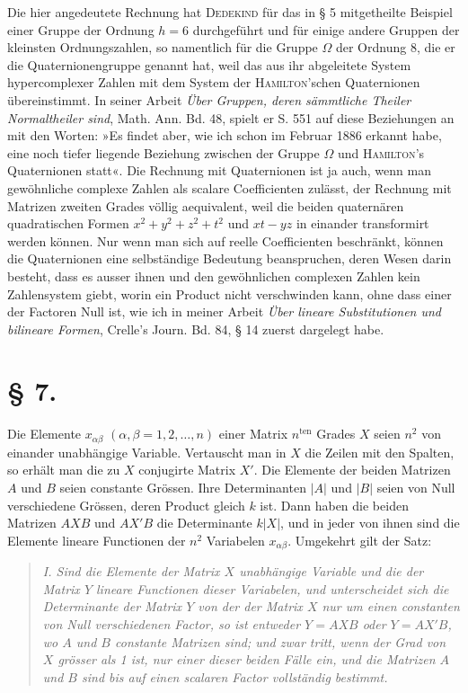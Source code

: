 \documentclass[11pt]{article}
\newcommand{\ten}{\mathrm{ten}}
\begin{document}
Die hier angedeutete Rechnung hat \textsc{Dedekind} für das in § 5 mitgetheilte Beispiel einer Gruppe der Ordnung $h=6$ durchgeführt und für einige andere Gruppen der kleinsten Ordnungszahlen, so namentlich für die Gruppe $\Omega$ der Ordnung 8, die er die Quaternionengruppe genannt hat, weil das aus ihr abgeleitete System hypercomplexer Zahlen mit dem System der \textsc{Hamilton}'schen Quaternionen übereinstimmt. In seiner Arbeit \emph{Über Gruppen, deren sämmtliche Theiler Normaltheiler sind}, Math. Ann. Bd. 48, spielt er S. 551 auf diese Beziehungen an mit den Worten: »Es findet aber, wie ich schon im Februar 1886 erkannt habe, eine noch tiefer liegende Beziehung zwischen der Gruppe $\Omega$ und \textsc{Hamilton}'s Quaternionen statt«. Die Rechnung mit Quaternionen ist ja auch, wenn man gewöhnliche complexe Zahlen als scalare Coefficienten zulässt, der Rechnung mit Matrizen zweiten Grades völlig aequivalent, weil die beiden quaternären quadratischen Formen $x^2+y^2+z^2+t^2$ und $xt-yz$ in einander transformirt werden können. Nur wenn man sich auf reelle Coefficienten beschränkt, können die Quaternionen eine selbständige Bedeutung beanspruchen, deren Wesen darin besteht, dass es ausser ihnen und den gewöhnlichen complexen Zahlen kein Zahlensystem giebt, worin ein Product nicht verschwinden kann, ohne dass einer der Factoren Null ist, wie ich in meiner Arbeit \emph{Über lineare Substitutionen und bilineare Formen}, Crelle's Journ. Bd. 84, § 14 zuerst dargelegt habe.

\section*{§ 7.}

Die Elemente $x_{\alpha\beta}$ $(\alpha,\beta=1,2,\ldots,n)$ einer Matrix $n^{\ten}$ Grades $X$ seien $n^2$ von einander unabhängige Variable. Vertauscht man in $X$ die Zeilen mit den Spalten, so erhält man die zu $X$ conjugirte Matrix $X'$. Die Elemente der beiden Matrizen $A$ und $B$ seien constante Grössen. Ihre Determinanten $|A|$ und $|B|$ seien von Null verschiedene Grössen, deren Product gleich $k$ ist. Dann haben die beiden Matrizen $AXB$ und $AX'B$ die Determinante $k|X|$, und in jeder von ihnen sind die Elemente lineare Functionen der $n^2$ Variabelen $x_{\alpha\beta}$. Umgekehrt gilt der Satz:

\begin{quote}\itshape
I. Sind die Elemente der Matrix $X$ unabhängige Variable und die der Matrix $Y$ lineare Functionen dieser Variabelen, und unterscheidet sich die Determinante der Matrix $Y$ von der der Matrix $X$ nur um einen constanten von Null verschiedenen Factor, so ist entweder $Y=AXB$ oder $Y=AX'B$, wo $A$ und $B$ constante Matrizen sind; und zwar tritt, wenn der Grad von $X$ grösser als 1 ist, nur einer dieser beiden Fälle ein, und die Matrizen $A$ und $B$ sind bis auf einen scalaren Factor vollständig bestimmt.
\end{quote}
\end{document}
